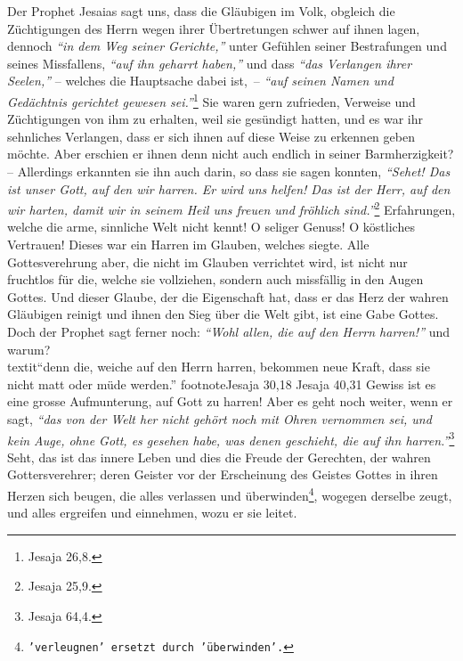 Der Prophet Jesaias sagt uns, dass die Gläubigen im Volk, obgleich die
Züchtigungen des Herrn wegen ihrer Übertretungen schwer auf ihnen lagen,
dennoch
\textit{"`in dem Weg seiner Gerichte,"'} unter Gefühlen seiner Bestrafungen und
seines Missfallens, \textit{"`auf ihn geharrt haben,"'} und dass \textit{"`das
Verlangen ihrer Seelen,"'} -- welches die Hauptsache dabei ist,~--
\textit{"`auf seinen Namen und Gedächtnis gerichtet gewesen
sei."'}\footnote{Jesaja 26,8.}
Sie waren gern
zufrieden, Verweise und Züchtigungen von ihm zu erhalten, weil sie gesündigt
hatten, und es war ihr sehnliches Verlangen, dass er sich ihnen auf diese Weise
zu erkennen geben möchte.  Aber erschien er ihnen denn
nicht auch endlich in
seiner Barmherzigkeit? -- Allerdings erkannten sie ihn auch darin, so dass sie
sagen konnten,
\textit{"`Sehet! Das ist unser Gott, auf den wir harren. Er wird uns
helfen! Das ist der Herr, auf den wir harten, damit wir in seinem Heil uns
freuen und fröhlich sind."'}\footnote{Jesaja 25,9.}
Erfahrungen, welche die arme,
sinnliche Welt nicht kennt! O seliger Genuss! O köstliches
Vertrauen! Dieses war
ein Harren im Glauben, welches siegte. Alle Gottesverehrung aber, die nicht im
Glauben verrichtet wird, ist nicht nur fruchtlos
 für die, welche sie vollziehen,
sondern auch missfällig in den Augen Gottes. Und dieser Glaube, der die
Eigenschaft hat, dass er das Herz der wahren Gläubigen reinigt und ihnen den
Sieg über die Welt gibt, ist eine Gabe Gottes. Doch
der Prophet sagt
ferner noch:
\textit{"`Wohl allen, die auf den Herrn harren!"'} und warum?\\textit{"`denn
die, weiche
auf den Herrn harren, bekommen neue Kraft, dass sie nicht matt oder müde
werden."'}
footnote{Jesaja 30,18 Jesaja 40,31}
Gewiss ist es eine grosse Aufmunterung, auf Gott
zu harren! Aber es geht noch weiter, wenn er sagt,
\textit{"`das von der Welt her
nicht gehört noch mit Ohren vernommen sei, und kein Auge, ohne Gott, es gesehen
habe, was denen geschieht, die auf ihn harren."'}\footnote{Jesaja 64,4.}
Seht, das ist das innere Leben und dies die Freude der Gerechten, der wahren
Gottersverehrer;
deren Geister vor der Erscheinung des Geistes Gottes in ihren Herzen sich
beugen, die alles verlassen und überwinden\footnote{\texttt{'verleugnen'
ersetzt
durch 'überwinden'.}}, wogegen derselbe zeugt, und alles
ergreifen und einnehmen, wozu er sie leitet.

